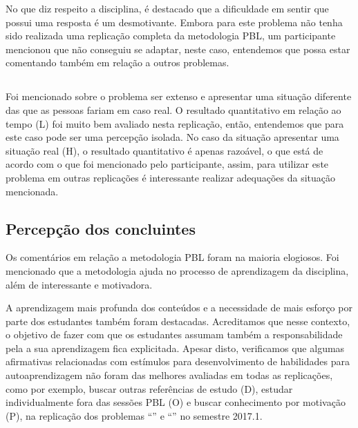 No que diz respeito a disciplina, é destacado que a dificuldade
em sentir que possui uma resposta é um desmotivante.
Embora para este problema não tenha sido realizada uma replicação
completa da metodologia \ac{PBL}, um participante mencionou que não
conseguiu se adaptar, neste caso, entendemos que possa estar
comentando também em relação a outros problemas.

\subsection{\ProblemaG}

Foi mencionado sobre o problema ser extenso e
apresentar uma situação diferente das que as pessoas fariam em caso
real.
O resultado quantitativo em relação ao tempo (L)
foi muito bem avaliado nesta replicação, então, entendemos que
para este caso pode ser uma percepção isolada.
No caso da situação apresentar uma situação real (H), o resultado
quantitativo é apenas razoável, o que está de acordo
com o que foi mencionado pelo participante, assim, para utilizar
este problema em outras replicações é interessante realizar adequações
da situação mencionada.

\subsection{Percepção dos concluintes}

Os comentários em relação a metodologia \ac{PBL} foram na maioria elogiosos.
Foi mencionado que a metodologia ajuda no processo de aprendizagem da
disciplina, além de interessante e motivadora.

A aprendizagem mais profunda dos conteúdos e a necessidade de mais
esforço por parte dos estudantes também foram destacadas.
Acreditamos que nesse contexto, o objetivo de fazer com que
os estudantes assumam também a responsabilidade pela a
sua aprendizagem fica explicitada.
Apesar disto, verificamos que algumas afirmativas relacionadas
com estímulos para desenvolvimento de habilidades para autoaprendizagem
não foram das melhores avaliadas em todas as replicações,
como por exemplo, buscar outras referências de estudo (D),
estudar individualmente fora das sessões \ac{PBL} (O) e buscar
conhecimento por motivação (P), na replicação dos
problemas ``\ProblemaG'' e ``\ProblemaB'' no semestre 2017.1.

